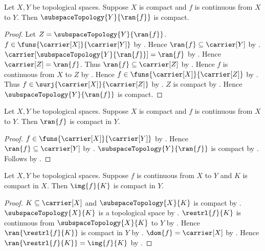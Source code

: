 \begin{theorem}\label{continuous_range_subspace_is_compact}
    Let $X,Y$ be topological spaces.
    Suppose $X$ is compact and $f$ is continuous from $X$ to $Y$.
    Then $\subspaceTopology{Y}{\ran{f}}$ is compact.
\end{theorem}
\begin{proof}
    Let $Z=\subspaceTopology{Y}{\ran{f}}$.
    $f\in\funs{\carrier[X]}{\carrier[Y]}$ by
        .
    Hence $\ran{f}\subseteq\carrier[Y]$ by .
    $\carrier[\subspaceTopology{Y}{\ran{f}}]=\ran{f}$ by
        .
    Hence $\carrier[Z]=\ran{f}$.
    Thus $\ran{f}\subseteq\carrier[Z]$ by .
    Hence $f$ is continuous from $X$ to $Z$ by
        .
    Hence $f\in\funs{\carrier[X]}{\carrier[Z]}$ by
        .
    Thus $f\in\surj{\carrier[X]}{\carrier[Z]}$ by
        .
    $Z$ is compact by .
    Hence $\subspaceTopology{Y}{\ran{f}}$ is compact.
\end{proof}

\begin{corollary}\label{continuous_image_is_compact}
    Let $X,Y$ be topological spaces.
    Suppose $X$ is compact and $f$ is continuous from $X$ to $Y$.
    Then $\ran{f}$ is compact in $Y$.
\end{corollary}
\begin{proof}
    $f\in\funs{\carrier[X]}{\carrier[Y]}$ by
        .
    Hence $\ran{f}\subseteq\carrier[Y]$ by .
    $\subspaceTopology{Y}{\ran{f}}$ is compact by
        .
    Follows by .
\end{proof}

\begin{theorem}\label{continuous_image_of_compact_subset}
    Let $X,Y$ be topological spaces.
    Suppose $f$ is continuous from $X$ to $Y$ and $K$ is compact in $X$.
    Then $\img{f}{K}$ is compact in $Y$.
\end{theorem}
\begin{proof}
    $K\subseteq\carrier[X]$ and $\subspaceTopology{X}{K}$ is compact by
        .
    $\subspaceTopology{X}{K}$ is a topological space by
        .
    $\restrl{f}{K}$ is continuous from $\subspaceTopology{X}{K}$ to $Y$ by
        .
    Hence $\ran{\restrl{f}{K}}$ is compact in $Y$ by
        .
    $\dom{f}=\carrier[X]$ by .
    Hence $\ran{\restrl{f}{K}}=\img{f}{K}$ by .
\end{proof}
